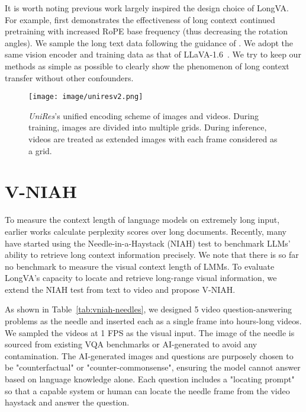 It is worth noting previous work largely inspired the design choice of LongVA. For example,\cite{xiong2023effective} first demonstrates the effectiveness of long context continued pretraining with increased RoPE base frequency (thus decreasing the rotation angles). We sample the long text data following the guidance of \citep{fu2024data}. We adopt the same vision encoder and training data as that of LLaVA-1.6~\cite{liu2024llavanext}. We try to keep our methods as simple as possible to clearly show the phenomenon of long context transfer without other confounders.

\begin{figure}[t]
    \centering
    \texttt{[image: image/uniresv2.png]}
    \caption{\textit{UniRes}'s unified encoding scheme of images and videos. During training, images are divided into multiple grids. During inference, videos are treated as extended images with each frame considered as a grid. }
    \label{fig:unires_plot}
\end{figure}\section{V-NIAH}
\label{sec:v-niah}

To measure the context length of language models on extremely long input, earlier works calculate perplexity scores over long documents. Recently, many have started using the Needle-in-a-Haystack (NIAH) test to benchmark LLMs' ability to retrieve long context information precisely. We note that there is so far no benchmark to measure the visual context length of LMMs. 
To evaluate LongVA's capacity to locate and retrieve long-range visual information, we extend the NIAH test from text to video and propose V-NIAH. 

As shown in Table~\ref{tab:vniah-needles}, we designed 5 video question-answering problems as the needle and inserted each as a single frame into hours-long videos. We sampled the videos at 1 FPS as the visual input.  The image of the needle is sourced from existing VQA benchmarks or AI-generated to avoid any contamination. The AI-generated images and questions are purposely chosen to be "counterfactual" or "counter-commonsense", ensuring the model cannot answer based on language knowledge alone. Each question includes a "locating prompt" so that a capable system or human can locate the needle frame from the video haystack and answer the question.

